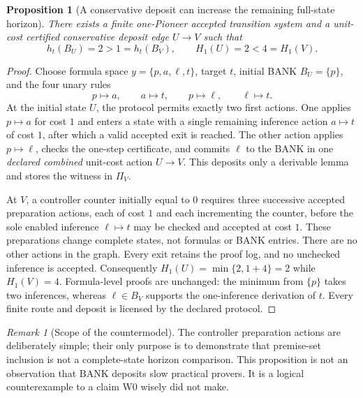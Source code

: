 \documentclass[11pt,letterpaper]{article}
\newtheorem{proposition}[theorem]{Proposition}
\theoremstyle{definition}
\theoremstyle{remark}
\newtheorem{remark}[theorem]{Remark}
\newcommand{\Hone}{H_{1}}
\begin{document}
\begin{proposition}[A conservative deposit can increase the remaining full-state horizon]\label{prop:B_counter}
There exists a finite one-Pioneer accepted transition system and a unit-cost certified conservative deposit edge $U\to V$ such that
\[
 h_t(B_U)=2>1=h_t(B_V),\qquad \Hone(U)=2<4=\Hone(V).
\]
\end{proposition}
\begin{proof}
Choose formula space $y=\{p,a,\ell,t\}$, target $t$, initial BANK $B_U=\{p\}$, and the four unary rules
\[
 p\mapsto a,\qquad a\mapsto t,\qquad p\mapsto\ell,\qquad \ell\mapsto t.
\]
At the initial state $U$, the protocol permits exactly two first actions. One applies $p\mapsto a$ for cost $1$ and enters a state with a single remaining inference action $a\mapsto t$ of cost $1$, after which a valid accepted exit is reached. The other action applies $p\mapsto\ell$, checks the one-step certificate, and commits $\ell$ to the BANK in one \emph{declared combined} unit-cost action $U\to V$. This deposits only a derivable lemma and stores the witness in $\Pi_V$.

At $V$, a controller counter initially equal to $0$ requires three successive accepted preparation actions, each of cost $1$ and each incrementing the counter, before the sole enabled inference $\ell\mapsto t$ may be checked and accepted at cost $1$. These preparations change complete states, not formulas or BANK entries. There are no other actions in the graph. Every exit retains the proof log, and no unchecked inference is accepted. Consequently $\Hone(U)=\min\{2,1+4\}=2$ while $\Hone(V)=4$. Formula-level proofs are unchanged: the minimum from $\{p\}$ takes two inferences, whereas $\ell\in B_V$ supports the one-inference derivation of $t$. Every finite route and deposit is licensed by the declared protocol.
\end{proof}

\begin{remark}[Scope of the countermodel]
The controller preparation actions are deliberately simple; their only purpose is to demonstrate that premise-set inclusion is not a complete-state horizon comparison. This proposition is not an observation that BANK deposits slow practical provers. It is a logical counterexample to a claim W0 wisely did not make.
\end{remark}
\end{document}

